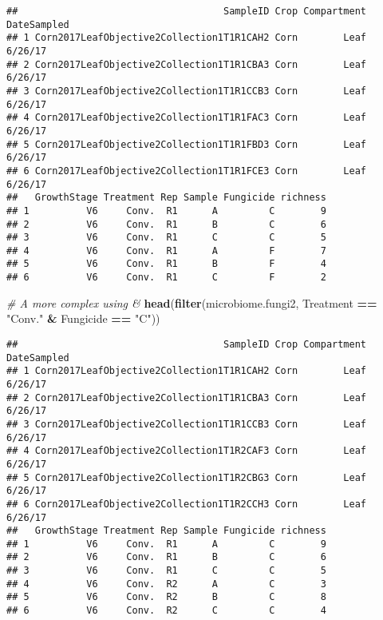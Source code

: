 \documentclass[
]{article}
\newenvironment{Shaded}{\begin{snugshade}}{\end{snugshade}}
\newcommand{\CommentTok}[1]{\textcolor[rgb]{0.56,0.35,0.01}{\textit{#1}}}
\newcommand{\FunctionTok}[1]{\textcolor[rgb]{0.13,0.29,0.53}{\textbf{#1}}}
\newcommand{\NormalTok}[1]{#1}
\newcommand{\SpecialCharTok}[1]{\textcolor[rgb]{0.81,0.36,0.00}{\textbf{#1}}}
\newcommand{\StringTok}[1]{\textcolor[rgb]{0.31,0.60,0.02}{#1}}
\begin{document}
\begin{verbatim}
##                                    SampleID Crop Compartment DateSampled
## 1 Corn2017LeafObjective2Collection1T1R1CAH2 Corn        Leaf     6/26/17
## 2 Corn2017LeafObjective2Collection1T1R1CBA3 Corn        Leaf     6/26/17
## 3 Corn2017LeafObjective2Collection1T1R1CCB3 Corn        Leaf     6/26/17
## 4 Corn2017LeafObjective2Collection1T1R1FAC3 Corn        Leaf     6/26/17
## 5 Corn2017LeafObjective2Collection1T1R1FBD3 Corn        Leaf     6/26/17
## 6 Corn2017LeafObjective2Collection1T1R1FCE3 Corn        Leaf     6/26/17
##   GrowthStage Treatment Rep Sample Fungicide richness
## 1          V6     Conv.  R1      A         C        9
## 2          V6     Conv.  R1      B         C        6
## 3          V6     Conv.  R1      C         C        5
## 4          V6     Conv.  R1      A         F        7
## 5          V6     Conv.  R1      B         F        4
## 6          V6     Conv.  R1      C         F        2
\end{verbatim}

\begin{Shaded}
\begin{Highlighting}[]
\CommentTok{\# A more complex using \& }
\FunctionTok{head}\NormalTok{(}\FunctionTok{filter}\NormalTok{(microbiome.fungi2, Treatment }\SpecialCharTok{==} \StringTok{"Conv."} \SpecialCharTok{\&}\NormalTok{ Fungicide }\SpecialCharTok{==} \StringTok{"C"}\NormalTok{))}
\end{Highlighting}
\end{Shaded}

\begin{verbatim}
##                                    SampleID Crop Compartment DateSampled
## 1 Corn2017LeafObjective2Collection1T1R1CAH2 Corn        Leaf     6/26/17
## 2 Corn2017LeafObjective2Collection1T1R1CBA3 Corn        Leaf     6/26/17
## 3 Corn2017LeafObjective2Collection1T1R1CCB3 Corn        Leaf     6/26/17
## 4 Corn2017LeafObjective2Collection1T1R2CAF3 Corn        Leaf     6/26/17
## 5 Corn2017LeafObjective2Collection1T1R2CBG3 Corn        Leaf     6/26/17
## 6 Corn2017LeafObjective2Collection1T1R2CCH3 Corn        Leaf     6/26/17
##   GrowthStage Treatment Rep Sample Fungicide richness
## 1          V6     Conv.  R1      A         C        9
## 2          V6     Conv.  R1      B         C        6
## 3          V6     Conv.  R1      C         C        5
## 4          V6     Conv.  R2      A         C        3
## 5          V6     Conv.  R2      B         C        8
## 6          V6     Conv.  R2      C         C        4
\end{verbatim}
\end{document}
